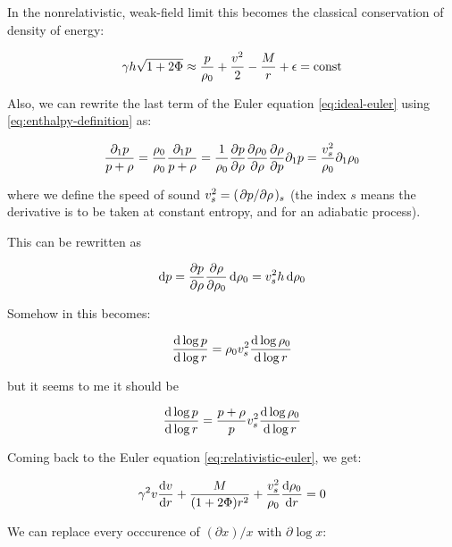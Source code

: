 \documentclass[main.tex]{subfiles}
\begin{document}
In the nonrelativistic, weak-field limit this  becomes the classical conservation of density of energy:

\begin{equation}
    \gamma h \sqrt{1+2\Phi} \approx \frac{p}{\rho_0} + \frac{v^2}{2} - \frac{M}{r} + \epsilon = \const
\end{equation}

Also, we can rewrite the last term of the Euler equation \eqref{eq:ideal-euler} using \eqref{eq:enthalpy-definition}  as:

\begin{equation}
  \frac{\partial_1 p}{p + \rho} =
  \frac{\rho_0}{\rho_0} \frac{\partial_1 p}{p + \rho} =
  \frac{1}{\rho_0} \pdv{p}{\rho} \pdv{\rho_0}{\rho}
  \pdv{\rho}{p}   \partial_1 p =
  \frac{v_s^2}{\rho_0} \partial_1\rho_0
\end{equation}

where we define the speed of sound \(v_s^2 = (\pdv*{p}{\rho})_s\) (the index \(s\) means the derivative is to be taken at constant entropy, and for an adiabatic process).

This can be rewritten as

\begin{equation}
  \dd{p} = \pdv{p}{\rho} \pdv{\rho}{\rho_0} \dd{\rho_0} = v_s^2 h \dd{\rho_0}
\end{equation}

\begin{greenbox}
  Somehow in \cite[page 175]{Nobili:2000} this becomes:

  \begin{equation}
    \dv{\log p }{\log r} = \rho_0 v_s^2 \dv{\log \rho_0}{\log r }
  \end{equation}

  but it seems to me it should be

  \begin{equation}
  \dv{\log p }{\log r} = \frac{p+\rho}{p} v_s^2 \dv{\log \rho_0}{\log r }
  \end{equation}
\end{greenbox}

Coming back to the Euler equation \eqref{eq:relativistic-euler},  we get:

\begin{equation}
  \gamma^2 v \dv{v}{r} + \frac{M}{(1+ 2 \Phi) r^2}
  + \frac{v_s^2 }{\rho_0}\dv{\rho_0}{r} = 0
\end{equation}

We can replace every occcurence of \((\partial x) / x \) with \(\partial \log x \):
\end{document}

